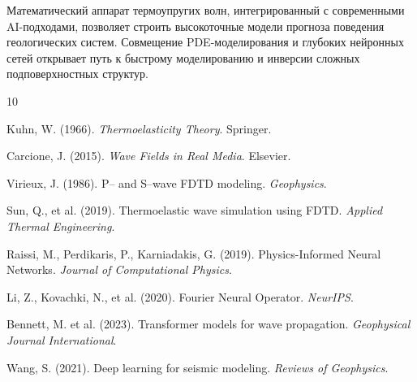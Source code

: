 Математический аппарат термоупругих волн, интегрированный с современными AI-подходами, позволяет строить высокоточные модели прогноза поведения геологических систем. Совмещение PDE-моделирования и глубоких нейронных сетей открывает путь к быстрому моделированию и инверсии сложных подповерхностных структур.



\begin{thebibliography}{10}

Kuhn, W. (1966).
\textit{Thermoelasticity Theory}. Springer.

Carcione, J. (2015).
\textit{Wave Fields in Real Media}. Elsevier.

Virieux, J. (1986).  
P– and S–wave FDTD modeling.  
\textit{Geophysics}.

Sun, Q., et al. (2019).  
Thermoelastic wave simulation using FDTD.  
\textit{Applied Thermal Engineering}.

Raissi, M., Perdikaris, P., Karniadakis, G. (2019).  
Physics-Informed Neural Networks.  
\textit{Journal of Computational Physics}.

Li, Z., Kovachki, N., et al. (2020).  
Fourier Neural Operator.  
\textit{NeurIPS}.

Bennett, M. et al. (2023).  
Transformer models for wave propagation.  
\textit{Geophysical Journal International}.

Wang, S. (2021).  
Deep learning for seismic modeling.  
\textit{Reviews of Geophysics}.

\end{thebibliography}
